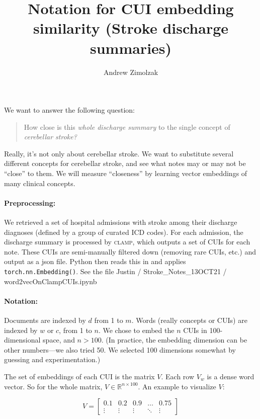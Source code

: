 \documentclass{article}
\title{Notation for CUI embedding similarity (Stroke discharge summaries)}
\author{Andrew Zimolzak}
\begin{document}
\maketitle

We want to answer the following question:

\begin{quote}
  How close is this \emph{whole discharge summary} to the single
  concept of \emph{cerebellar stroke?}
\end{quote}

Really, it's not only about cerebellar stroke. We want to substitute
several different concepts for cerebellar stroke, and see what notes
may or may not be ``close'' to them. We will measure ``closeness'' by
learning vector embeddings of many clinical concepts.

\paragraph{Preprocessing:} We retrieved a set of hospital admissions with
stroke among their discharge diagnoses (defined by a group of curated
ICD codes). For each admission, the discharge summary is processed by
\textsc{clamp}, which outputs a set of CUIs for each note. These CUIs
are semi-manually filtered down (removing rare CUIs, etc.) and output
as a json file. Python then reads this in and applies
\texttt{torch.nn.Embedding()}. See the file Justin /
Stroke\_Notes\_13OCT21 / word2vecOnClampCUIs.ipynb

\paragraph{Notation:} Documents are indexed by $d$ from 1 to $m$.
Words (really concepts or CUIs) are indexed by $w$ or $c$, from 1 to
$n$. We chose to embed the $n$ CUIs in 100-dimensional space, and $n >
100$. (In practice, the embedding dimension can be other numbers---we
also tried 50. We selected 100 dimensions somewhat by guessing and
experimentation.)

The set of embeddings of each CUI is the matrix $V$. Each row $V_w$ is
a dense word vector. So for the whole matrix, $V \in \mathbb{R}^{n
  \times 100}$. An example to visualize $V$:

\begin{equation}
  V = \left[
      \begin{array}{ccccc}
        0.1 & 0.2 & 0.9 & \ldots & 0.75 \\
        \vdots & \vdots & \vdots & \ddots & \vdots
      \end{array} \right]
\end{equation}
\end{document}
